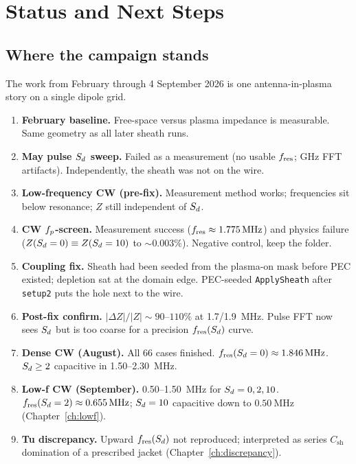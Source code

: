 \chapter{Status and Next Steps}
\label{ch:status}

\section{Where the campaign stands}

The work from February through 4 September 2026 is one antenna-in-plasma story on a single dipole grid.

\begin{enumerate}[leftmargin=1.5em]
\item \textbf{February baseline.} Free-space versus plasma impedance is measurable. Same geometry as all later sheath runs.
\item \textbf{May pulse \(S_d\) sweep.} Failed as a measurement (no usable \(f_{\mathrm{res}}\); GHz FFT artifacts). Independently, the sheath was not on the wire.
\item \textbf{Low-frequency CW (pre-fix).} Measurement method works; frequencies sit below resonance; \(Z\) still independent of \(S_d\).
\item \textbf{CW \(f_p\)-screen.} Measurement success (\(f_{\mathrm{res}}\approx\SI{1.775}{\mega\hertz}\)) and physics failure (\(Z(S_d=0)\equiv Z(S_d=10)\) to \(\sim 0.003\%\)). Negative control, keep the folder.
\item \textbf{Coupling fix.} Sheath had been seeded from the plasma-on mask before PEC existed; depletion sat at the domain edge. PEC-seeded \texttt{ApplySheath} after \texttt{setup2} puts the hole next to the wire.
\item \textbf{Post-fix confirm.} \(\lvert\Delta Z\rvert/\lvert Z\rvert\sim 90\)--\(110\%\) at 1.7/1.9~MHz. Pulse FFT now sees \(S_d\) but is too coarse for a precision \(f_{\mathrm{res}}(S_d)\) curve.
\item \textbf{Dense CW (August).} All 66 cases finished. \(f_{\mathrm{res}}(S_d=0)\approx\SI{1.846}{\mega\hertz}\). \(S_d\ge 2\) capacitive in 1.50--2.30~MHz.
\item \textbf{Low-f CW (September).} 0.50--1.50~MHz for \(S_d=0,2,10\). \(f_{\mathrm{res}}(S_d=2)\approx\SI{0.655}{\mega\hertz}\); \(S_d=10\) capacitive down to \(\SI{0.50}{\mega\hertz}\) (Chapter~\ref{ch:lowf}).
\item \textbf{Tu discrepancy.} Upward \(f_{\mathrm{res}}(S_d)\) not reproduced; interpreted as series \(C_{\mathrm{sh}}\) domination of a prescribed jacket (Chapter~\ref{ch:discrepancy}).
\end{enumerate}

